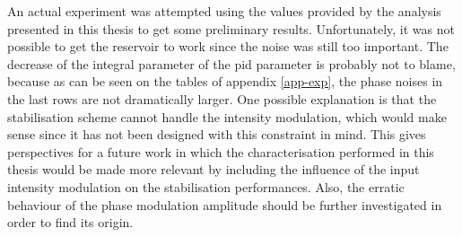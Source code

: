 An actual \rcer experiment was attempted using the values provided by the analysis presented in this thesis to get some preliminary results. Unfortunately, it was not possible to get the reservoir to work since the noise was still too important. The decrease of the integral parameter of the \gls{pid} parameter is probably not to blame, because as can be seen on the tables of appendix \ref{app-exp}, the phase noises in the last rows are not dramatically larger. One possible explanation is that the stabilisation scheme cannot handle the intensity modulation, which would make sense since it has not been designed with this constraint in mind. This gives perspectives for a future work in which the characterisation performed in this thesis would be made more relevant by including the influence of the input intensity modulation on the stabilisation performances. Also, the erratic behaviour of the phase modulation amplitude should be further investigated in order to find its origin.